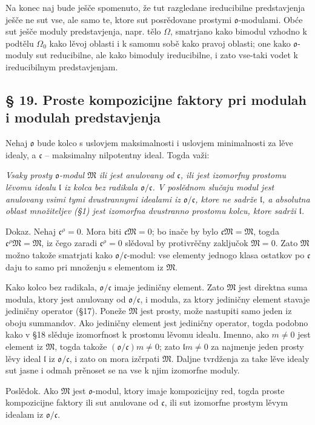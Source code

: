 \documentclass[11pt]{article}
\providecommand{\mo}{\mathfrak{o}}
\providecommand{\ml}{\mathfrak{l}}
\providecommand{\mc}{\mathfrak{c}}
\providecommand{\mM}{\mathfrak{M}}
\begin{document}
Na konec naj bude ješče spomenuto, že tut razgledane ireducibilne predstavjenja ješče ne sut vse, ale samo te, ktore sut posrědovane prostymi $\mo$-modulami. Obće sut ješče moduly predstavjenja, napr. tělo $\Omega$, smatrjano kako bimodul vzhodno k podtělu $\Omega_0$ kako lěvoj oblasti i k samomu sobě kako pravoj oblasti; one kako $\mo$-moduly sut reducibilne, ale kako bimoduly ireducibilne, i zato vse-taki vodet k ireducibilnym predstavjenjam.

\subsection*{§ 19. Proste kompozicijne faktory pri modulah i modulah predstavjenja}

Nehaj $\mo$ bude kolco s uslovjem maksimalnosti i uslovjem minimalnosti za lěve idealy, a $\mc$ -- maksimalny nilpotentny ideal. Togda važi:

\emph{Vsaky prosty $\mo$-modul $\mM$ ili jest anulovany od $\mc$, ili jest izomorfny prostomu lěvomu idealu $\ml$ iz kolca bez radikala $\mo/\mc$. V poslědnom slučaju modul jest anulovany vsimi tymi dvustrannymi idealami iz $\mo/\mc$, ktore ne sadrže $\ml$, a absolutna oblast množiteljev (§1) jest izomorfna dvustranno prostomu kolcu, ktore sadrži $\ml$.}

Dokaz. Nehaj $\mc^\rho=0$. Mora biti $\mc\mM=0$; bo inače by bylo $\mc\mM=\mM$, togda $\mc^\rho\mM=\mM$, iz čego zaradi $\mc^\rho=0$ slědoval by protivrěčny zaključok $\mM=0$. Zato $\mM$ možno takože smatrjati kako $\mo/\mc$-modul: vse elementy jednogo klasa ostatkov po $\mc$ daju to samo pri množenju s elementom iz $\mM$.

Kako kolco bez radikala, $\mo/\mc$ imaje jediničny element. Zato $\mM$ jest direktna suma modula, ktory jest anulovany od $\mo/\mc$, i modula, za ktory jediničny element stavaje jediničny operator (§17). Poneže $\mM$ jest prosty, može nastupiti samo jeden iz oboju summandov. Ako jediničny element jest jediničny operator, togda podobno kako v §18 slěduje izomorfnost k prostomu lěvomu idealu. Imenno, ako $m\ne0$ jest element iz $\mM$, togda takože $(\mo/\mc)m\ne0$; zato $\ml m\ne0$ za najmenje jeden prosty lěvy ideal $\ml$ iz $\mo/\mc$, i zato on mora izčrpati $\mM$. Daljne tvrdženja za take lěve idealy sut jasne i odmah prěnoset se na vse k njim izomorfne moduly.

Poslědok. Ako $\mM$ jest $\mo$-modul, ktory imaje kompozicijny red, togda proste kompozicijne faktory ili sut anulovane od $\mc$, ili sut izomorfne prostym lěvym idealam iz $\mo/\mc$.
\end{document}
